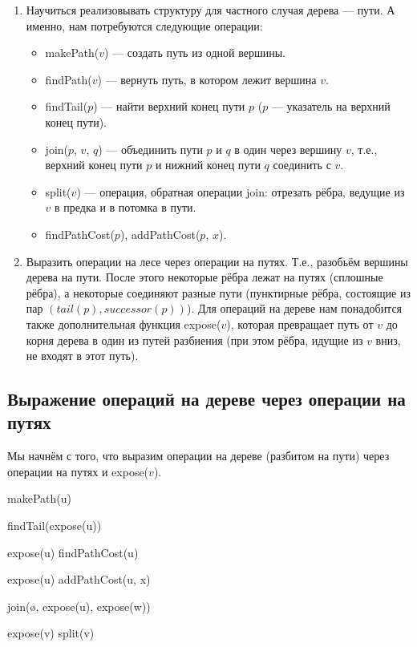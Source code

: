\begin{enumerate}
    \item Научиться реализовывать структуру для частного случая дерева --- пути. А именно, нам потребуются следующие операции:
        \begin{itemize}
            \item makePath($v$) --- создать путь из одной вершины.
            \item findPath($v$) --- вернуть путь, в котором лежит вершина $v$.
            \item findTail($p$) --- найти верхний конец пути $p$ ($p$ --- указатель на верхний конец пути). 
            \item join($p$, $v$, $q$) --- объединить пути $p$ и $q$ в один через вершину $v$, т.е., верхний конец пути $p$ и нижний конец пути $q$ соединить с $v$.
            \item split($v$) --- операция, обратная операции join: отрезать рёбра, ведущие из $v$ в предка и в потомка в пути.
            \item findPathCost($p$), addPathCost($p$, $x$).
        \end{itemize}
    \item Выразить операции на лесе через операции на путях. Т.е., разобьём вершины дерева на пути. После этого некоторые рёбра лежат на путях (сплошные рёбра), а некоторые соединяют разные пути (пунктирные рёбра, состоящие из пар $(tail(p), successor(p))$). Для операций на дереве нам понадобится также дополнительная функция expose($v$), которая превращает путь от $v$ до корня дерева в один из путей разбиения (при этом рёбра, идущие из $v$ вниз, не входят в этот путь).
\end{enumerate}

\subsection{Выражение операций на дереве через операции на путях}

Мы начнём с того, что выразим операции на дереве (разбитом на пути) через операции на путях и expose($v$).

\begin{algorithmic}[1]
		\State makePath(u)
    \EndProcedure
    
		\State findTail(expose(u))
    \EndProcedure
    
        \State expose(u)
		\State findPathCost(u)
    \EndProcedure
    
        \State expose(u)
		\State addPathCost(u, x)
    \EndProcedure
    
		\State join(\o, expose(u), expose(w))
    \EndProcedure
    
		\State expose(v)
		\State split(v)
    \EndProcedure
	
\end{algorithmic}

